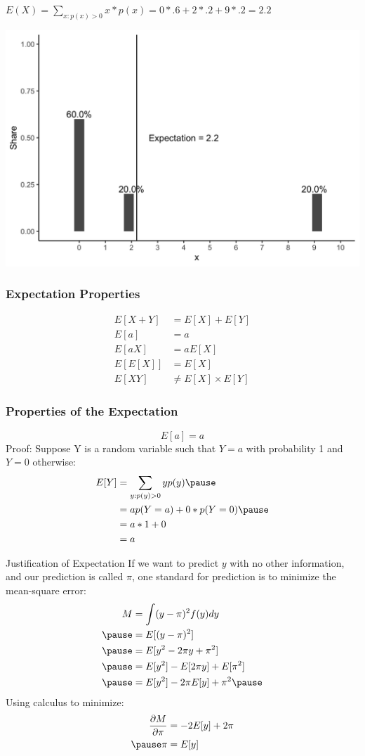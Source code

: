 \documentclass[aspectratio=169, handout]{beamer}
\numberwithin{equation}{section}
\begin{document}
\begin{frame}{$E(X)= \sum_{x:p(x)>0} x* p(x) =0*.6+2*.2+9*.2= 2.2$}

\begin{center}
\includegraphics[width=4 in]{plot3.png}
\end{center}

\end{frame}


\begin{frame}
\frametitle{Expectation Properties}
\begin{align*}
E[X+Y]&=E[X]+E[Y]\\
E[a]&=a\\
E[aX]&=aE[X]\\
E[E[X]]&=E[X]\\
E[XY]&\neq E[X]\times E[Y]
\end{align*}
\end{frame}


\begin{frame}
\frametitle{Properties of the Expectation}
$$E[a]=a$$\pause 
Proof:  Suppose Y is a random variable such that $Y = a$ with probability 1 and $Y= 0$ otherwise:
\begin{align*}
E[Y] &= \sum_{y: p(y)>0} y p(y) \pause\\
&= a p(Y=a)+ 0* p(Y=0) \pause\\
&= a*1  + 0  \\
&= a 
\end{align*}
\pause 

\end{frame}


\begin{frame}{Justification of Expectation}
If we want to predict $y$ with no other information, and our prediction is called $\pi$, one standard for prediction is to minimize the mean-square error:
\begin{align*}
M &= \int (y -\pi)^2 f(y) dy\\\pause
&=E[(y-\pi)^2]\\\pause
&=E[y^2-2\pi y+\pi^2]\\\pause
&=E[y^2]-E[2\pi y]+E[\pi^2]\\\pause
&=E[y^2]-2\pi E[y]+ \pi^2\pause
\end{align*}
Using calculus to minimize:\pause
\begin{align*}
\frac{\partial M}{\partial \pi}&=-2E[y]+ 2\pi\\\pause
\pi&=E[y]
\end{align*}
\end{frame}
\end{document}
